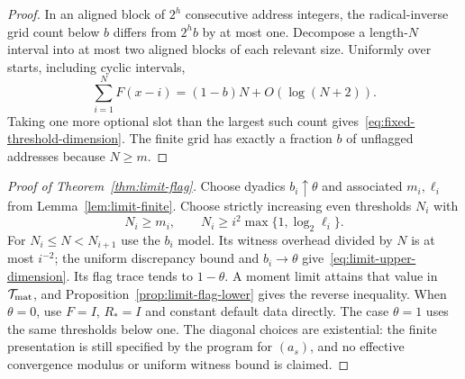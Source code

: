 \begin{proof}
In an aligned block of $2^h$ consecutive address integers, the radical-inverse grid count below $b$ differs from $2^hb$ by at most one. Decompose a length-$N$ interval into at most two aligned blocks of each relevant size. Uniformly over starts, including cyclic intervals,
\[
 \sum_{i=1}^NF(x-i)=(1-b)N+O(\log(N+2)).
\]
Taking one more optional slot than the largest such count gives~\eqref{eq:fixed-threshold-dimension}. The finite grid has exactly a fraction $b$ of unflagged addresses because $N\ge m$.
\end{proof}

\begin{proof}[Proof of Theorem~\ref{thm:limit-flag}]
Choose dyadics $b_i\uparrow\theta$ and associated $m_i,\ell_i$ from Lemma~\ref{lem:limit-finite}. Choose strictly increasing even thresholds $N_i$ with
\[
 N_i\ge m_i,\qquad
 N_i\ge i^2\max\{1,\log_2\ell_i\}.
\]
For $N_i\le N<N_{i+1}$ use the $b_i$ model. Its witness overhead divided by $N$ is at most $i^{-2}$; the uniform discrepancy bound and $b_i\to\theta$ give~\eqref{eq:limit-upper-dimension}. Its flag trace tends to $1-\theta$. A moment limit attains that value in $\mathcal T_{\rm mat}$, and Proposition~\ref{prop:limit-flag-lower} gives the reverse inequality. When $\theta=0$, use $F=I$, $R_*=I$ and constant default data directly. The case $\theta=1$ uses the same thresholds below one. The diagonal choices are existential: the finite presentation is still specified by the program for $(a_s)$, and no effective convergence modulus or uniform witness bound is claimed.
\end{proof}

